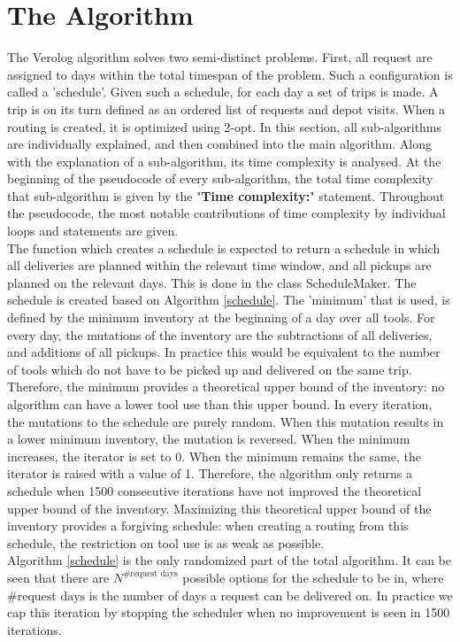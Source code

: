 \documentclass[a4paper]{article}
\begin{document}
\section{The Algorithm}
The Verolog algorithm solves two semi-distinct problems. First, all request are assigned to days within the total timespan of the problem. Such a configuration is called a 'schedule'. Given such a schedule, for each day a set of trips is made. A trip is on its turn defined as an ordered list of requests and depot visits. When a routing is created, it is optimized using 2-opt. In this section, all sub-algorithms are individually explained, and then combined into the main algorithm. Along with the explanation of a sub-algorithm, its time complexity is analysed. At the beginning of the pseudocode of every sub-algorithm, the total time complexity that sub-algorithm is given by the "\textbf{Time complexity:}" statement. Throughout the pseudocode, the most notable contributions of time complexity by individual loops and statements are given. \\

The function which creates a schedule is expected to return a schedule in which all deliveries are planned within the relevant time window, and all pickups are planned on the relevant days. This is done in the class ScheduleMaker. The schedule is created based on Algorithm \ref{schedule}. The 'minimum' that is used, is defined by the minimum inventory at the beginning of a day over all tools. For every day, the mutations of the inventory are the subtractions of all deliveries, and additions of all pickups. In practice this would be equivalent to the number of tools which do not have to be picked up and delivered on the same trip. Therefore, the minimum provides a theoretical upper bound of the inventory: no algorithm can have a lower tool use than this upper bound. In every iteration, the mutations to the schedule are purely random. When this mutation results in a lower minimum inventory, the mutation is reversed. When the minimum increases, the iterator is set to 0. When the minimum remains the same, the iterator is raised with a value of 1. Therefore, the algorithm only returns a schedule when 1500 consecutive iterations have not improved the theoretical upper bound of the inventory. Maximizing this theoretical upper bound of the inventory provides a forgiving schedule: when creating a routing from this schedule, the restriction on tool use is as weak as possible. \\ Algorithm \ref{schedule} is the only randomized part of the total algorithm. It can be seen that there are $N^{\text{\#request days}}$ possible options for the schedule to be in, where $\#\text{request days}$ is the number of days a request can be delivered on. In practice we cap this iteration by stopping the scheduler when no improvement is seen in 1500 iterations. \\
\end{document}

